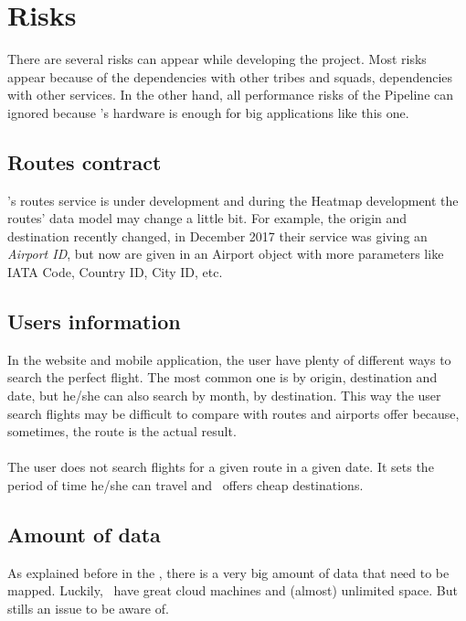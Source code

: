 
\section{Risks}

There are several risks can appear while developing the project. Most risks appear because of the dependencies with other tribes and squads, dependencies with other services. In the other hand, all performance risks of the Pipeline can ignored because \company's hardware is enough for big applications like this one.

\subsection{Routes contract}

\squad's routes service is under development and during the Heatmap development the routes' data model may change a little bit. For example, the origin and destination recently changed, in December 2017 their service was giving an \textit{Airport ID}, but now are given in an Airport object with more parameters like IATA Code\cite{iata_code}, Country ID, City ID, etc.

\subsection{Users information}

In the website and mobile application, the user have plenty of different ways to search the perfect flight. The most common one is by origin, destination and date, but he/she can also search by month, by destination. This way the user search flights may be difficult to compare with routes and airports offer because, sometimes, the route is the actual result.
\\\\
The user does not search flights for a given route in a given date. It sets the period of time he/she can travel and \company\ offers cheap destinations.

\subsection{Amount of data}

As explained before in the , there is a very big amount of data that need to be mapped. Luckily, \company\ have great cloud machines and (almost) unlimited space. But stills an issue to be aware of.

